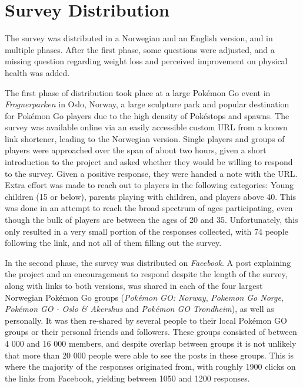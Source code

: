 \section{Survey Distribution}
\label{sec:survey-distribution}

The survey was distributed in a Norwegian and an English version, and in multiple phases. After the first phase, some questions were adjusted, and a missing question regarding weight loss and perceived improvement on physical health was added.

The first phase of distribution took place at a large Pokémon Go event in \emph{Frognerparken} in Oslo, Norway, a large sculpture park and popular destination for Pokémon Go players due to the high density of Pokéstops and spawns. The survey was available online via an easily accessible custom URL from a known link shortener, leading to the Norwegian version. Single players and groups of players were approached over the span of about two hours, given a short introduction to the project and asked whether they would be willing to respond to the survey. Given a positive response, they were handed a note with the URL. Extra effort was made to reach out to players in the following categories: Young children (15 or below), parents playing with children, and players above 40. This was done in an attempt to reach the broad spectrum of ages participating, even though the bulk of players are between the ages of 20 and 35. Unfortunately, this only resulted in a very small portion of the responses collected, with 74 people following the link, and not all of them filling out the survey.

In the second phase, the survey was distributed on \emph{Facebook}. A post explaining the project and an encouragement to respond despite the length of the survey, along with links to both versions, was shared in each of the four largest Norwegian Pokémon Go groups (\emph{Pokémon GO: Norway}, \emph{Pokemon Go Norge}, \emph{Pokémon GO - Oslo \& Akershus} and \emph{Pokémon GO Trondheim}), as well as personally. It was then re-shared by several people to their local Pokémon GO groups or their personal friends and followers. These groups consisted of between 4 000 and 16 000 members, and despite overlap between groups it is not unlikely that more than 20 000 people were able to see the posts in these groups. This is where the majority of the responses originated from, with roughly 1900 clicks on the links from Facebook, yielding between 1050 and 1200 responses.

